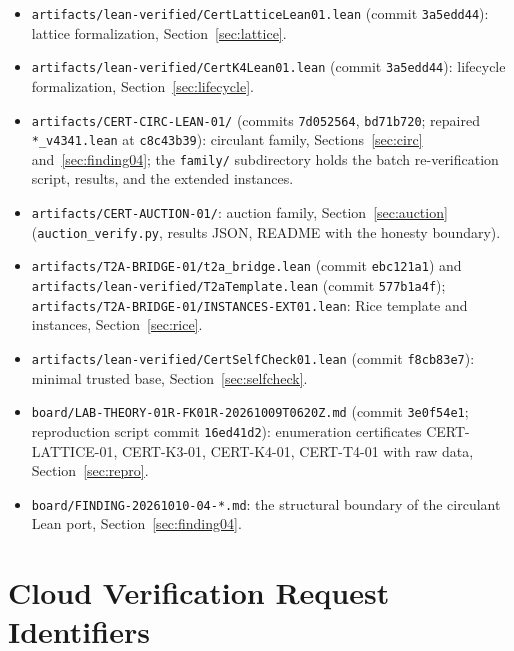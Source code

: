 \documentclass[11pt]{article}
\theoremstyle{definition}
\theoremstyle{remark}
\newcommand{\rid}[1]{\texttt{#1}}
\newcommand{\lean}[1]{\texttt{#1}}
\begin{document}
\begin{itemize}
\item \lean{artifacts/lean-verified/CertLatticeLean01.lean} (commit
\rid{3a5edd44}): lattice formalization, Section~\ref{sec:lattice}.
\item \lean{artifacts/lean-verified/CertK4Lean01.lean} (commit
\rid{3a5edd44}): lifecycle formalization, Section~\ref{sec:lifecycle}.
\item \lean{artifacts/CERT-CIRC-LEAN-01/} (commits \rid{7d052564},
\rid{bd71b720}; repaired \lean{*\_v4341.lean} at \rid{c8c43b39}): circulant
family, Sections~\ref{sec:circ} and~\ref{sec:finding04}; the
\lean{family/} subdirectory holds the batch re-verification script, results,
and the extended instances.
\item \lean{artifacts/CERT-AUCTION-01/}: auction family,
Section~\ref{sec:auction} (\lean{auction\_verify.py}, results JSON, README
with the honesty boundary).
\item \lean{artifacts/T2A-BRIDGE-01/t2a\_bridge.lean} (commit
\rid{ebc121a1}) and \lean{artifacts/lean-verified/T2aTemplate.lean} (commit
\rid{577b1a4f}); \lean{artifacts/T2A-BRIDGE-01/INSTANCES-EXT01.lean}:
Rice template and instances, Section~\ref{sec:rice}.
\item \lean{artifacts/lean-verified/CertSelfCheck01.lean} (commit
\rid{f8cb83e7}): minimal trusted base, Section~\ref{sec:selfcheck}.
\item \lean{board/LAB-THEORY-01R-FK01R-20261009T0620Z.md} (commit
\rid{3e0f54e1}; reproduction script commit \rid{16ed41d2}): enumeration
certificates CERT-LATTICE-01, CERT-K3-01, CERT-K4-01, CERT-T4-01 with raw
data, Section~\ref{sec:repro}.
\item \lean{board/FINDING-20261010-04-*.md}: the structural boundary of the
circulant Lean port, Section~\ref{sec:finding04}.
\end{itemize}

\section{Cloud Verification Request Identifiers}\label{app:rids}
\end{document}
